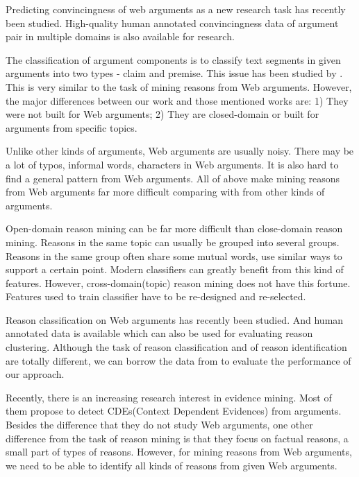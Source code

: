 \documentclass[11pt,a4paper]{article}
\begin{document}
Predicting convincingness of web arguments as a new research task has recently been studied\cite{habernal2016argument}. High-quality human annotated convincingness data of argument pair in multiple domains is also available for research\cite{habernal2016argument}. 

The classification of argument components is to classify text segments in given arguments into two types - claim and premise\cite{stab2014argumentation}. This issue has been studied by \cite{rooney2012applying,feng2011classifying,palau2009argumentation,mochales2011argumentation}. This is very similar to the task of mining reasons from Web arguments. However, the major differences between our work and those mentioned works are: 1) They were not built for Web arguments; 2) They are closed-domain or built for arguments from specific topics.

Unlike other kinds of arguments, Web arguments are usually noisy\cite{habernal2016argument}. There may be a lot of typos, informal words, characters in Web arguments. It is also hard to find a general pattern from Web arguments. All of above make mining reasons from Web arguments far more difficult comparing with from other kinds of arguments.

Open-domain reason mining can be far more difficult than close-domain reason mining. Reasons in the same topic can usually be grouped into several groups\cite{hasan2014you}. Reasons in the same group often share some mutual words, use similar ways to support a certain point. Modern classifiers can greatly benefit from this kind of features. However, cross-domain(topic) reason mining does not have this fortune. Features used to train classifier have to be re-designed and re-selected. 

Reason classification on Web arguments has recently been studied\cite{hasan2014you}. And human annotated data is available which can also be used for evaluating reason clustering. Although the task of reason classification and of reason identification are totally different, we can borrow the data from \cite{hasan2014you} to evaluate the performance of our approach. 

Recently, there is an increasing research interest in evidence mining\cite{cartright2011evidence, rinott2015show, aharoni2014benchmark}. Most of them propose to detect CDEs(Context Dependent Evidences) from arguments. Besides the difference that they do not study Web arguments, one other difference from the task of reason mining is that they focus on factual reasons, a small part of types of reasons. However, for mining reasons from Web arguments, we need to be able to identify all kinds of reasons from given Web arguments.  
\end{document}

